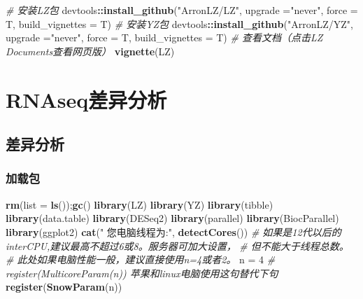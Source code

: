 \documentclass[
]{book}
\newenvironment{Shaded}{\begin{snugshade}}{\end{snugshade}}
\newcommand{\AttributeTok}[1]{\textcolor[rgb]{0.13,0.29,0.53}{#1}}
\newcommand{\CommentTok}[1]{\textcolor[rgb]{0.56,0.35,0.01}{\textit{#1}}}
\newcommand{\DecValTok}[1]{\textcolor[rgb]{0.00,0.00,0.81}{#1}}
\newcommand{\FunctionTok}[1]{\textcolor[rgb]{0.13,0.29,0.53}{\textbf{#1}}}
\newcommand{\NormalTok}[1]{#1}
\newcommand{\OtherTok}[1]{\textcolor[rgb]{0.56,0.35,0.01}{#1}}
\newcommand{\SpecialCharTok}[1]{\textcolor[rgb]{0.81,0.36,0.00}{\textbf{#1}}}
\newcommand{\StringTok}[1]{\textcolor[rgb]{0.31,0.60,0.02}{#1}}
\begin{document}
\begin{Shaded}
\begin{Highlighting}[]
\CommentTok{\# 安装LZ包}
\NormalTok{devtools}\SpecialCharTok{::}\FunctionTok{install\_github}\NormalTok{(}\StringTok{"ArronLZ/LZ"}\NormalTok{, }\AttributeTok{upgrade =}\StringTok{"never"}\NormalTok{, }\AttributeTok{force =}\NormalTok{ T, }
                         \AttributeTok{build\_vignettes =}\NormalTok{ T)}
\CommentTok{\# 安装YZ包}
\NormalTok{devtools}\SpecialCharTok{::}\FunctionTok{install\_github}\NormalTok{(}\StringTok{"ArronLZ/YZ"}\NormalTok{, }\AttributeTok{upgrade =}\StringTok{"never"}\NormalTok{, }\AttributeTok{force =}\NormalTok{ T, }
                         \AttributeTok{build\_vignettes =}\NormalTok{ T)}
\CommentTok{\# 查看文档（点击LZ Documents查看网页版）}
\FunctionTok{vignette}\NormalTok{(}\StringTok{\textquotesingle{}LZ\textquotesingle{}}\NormalTok{)}
\end{Highlighting}
\end{Shaded}

\chapter{RNAseq差异分析}\label{deg}

\section{差异分析}\label{deg-mian}

\subsection{加载包}\label{ux52a0ux8f7dux5305}

\begin{Shaded}
\begin{Highlighting}[]
\FunctionTok{rm}\NormalTok{(}\AttributeTok{list =} \FunctionTok{ls}\NormalTok{());}\FunctionTok{gc}\NormalTok{()}
\FunctionTok{library}\NormalTok{(LZ)}
\FunctionTok{library}\NormalTok{(YZ)}
\FunctionTok{library}\NormalTok{(tibble)}
\FunctionTok{library}\NormalTok{(data.table)}
\FunctionTok{library}\NormalTok{(DESeq2)}
\FunctionTok{library}\NormalTok{(parallel)}
\FunctionTok{library}\NormalTok{(BiocParallel)}
\FunctionTok{library}\NormalTok{(ggplot2)}
\FunctionTok{cat}\NormalTok{(}\StringTok{" 您电脑线程为:"}\NormalTok{, }\FunctionTok{detectCores}\NormalTok{())}
\CommentTok{\# 如果是12代以后的interCPU,建议最高不超过6或8。服务器可加大设置，}
\CommentTok{\#  但不能大于线程总数。}
\CommentTok{\# 此处如果电脑性能一般，建议直接使用n=4或者2。}
\NormalTok{n }\OtherTok{=} \DecValTok{4}
\CommentTok{\# register(MulticoreParam(n)) 苹果和linux电脑使用这句替代下句}
\FunctionTok{register}\NormalTok{(}\FunctionTok{SnowParam}\NormalTok{(n))}
\end{Highlighting}
\end{Shaded}
\end{document}
